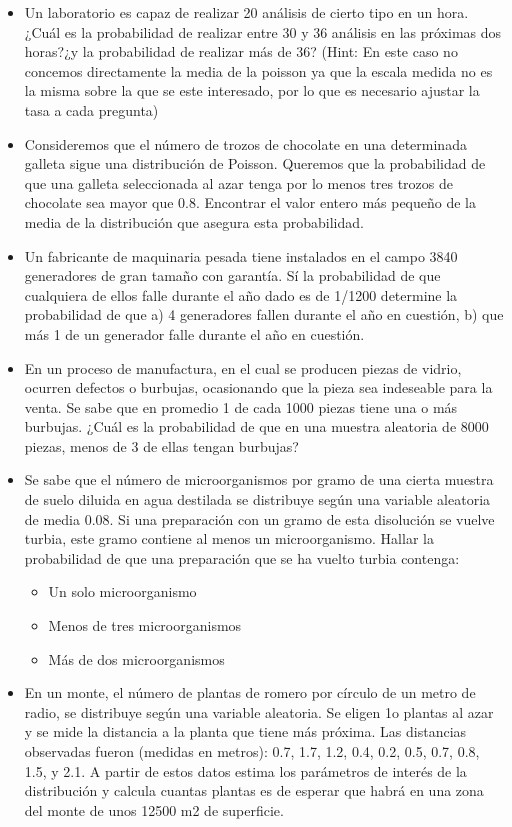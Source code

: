 \documentclass[
]{book}
\providecommand{\tightlist}{%
  \setlength{\itemsep}{0pt}\setlength{\parskip}{0pt}}
\begin{document}
\begin{itemize}
\tightlist
\item
  Un laboratorio es capaz de realizar 20 análisis de cierto tipo en un hora. ¿Cuál es la probabilidad de realizar entre 30 y 36 análisis en las próximas dos horas?¿y la probabilidad de realizar más de 36? (Hint: En este caso no concemos directamente la media de la poisson ya que la escala medida no es la misma sobre la que se este interesado, por lo que es necesario ajustar la tasa a cada pregunta)
\item
  Consideremos que el número de trozos de chocolate en una determinada galleta sigue una distribución de Poisson. Queremos que la probabilidad de que una galleta seleccionada al azar tenga por lo menos tres trozos de chocolate sea mayor que 0.8. Encontrar el valor entero más pequeño de la media de la distribución que asegura esta probabilidad.
\item
  Un fabricante de maquinaria pesada tiene instalados en el campo 3840 generadores de gran tamaño con garantía. Sí la probabilidad de que cualquiera de ellos falle durante el año dado es de 1/1200 determine la probabilidad de que a) 4 generadores fallen durante el año en cuestión, b) que más 1 de un generador falle durante el año en cuestión.
\item
  En un proceso de manufactura, en el cual se producen piezas de vidrio, ocurren defectos o burbujas, ocasionando que la pieza sea indeseable para la venta. Se sabe que en promedio 1 de cada 1000 piezas tiene una o más burbujas. ¿Cuál es la probabilidad de que en una muestra aleatoria de 8000 piezas, menos de 3 de ellas tengan burbujas?
\item
  Se sabe que el número de microorganismos por gramo de una cierta muestra de suelo diluida en agua destilada se distribuye según una variable aleatoria de media 0.08. Si una preparación con un gramo de esta disolución se vuelve turbia, este gramo contiene al menos un microorganismo. Hallar la probabilidad de que una preparación que se ha vuelto turbia contenga:

  \begin{itemize}
  \tightlist
  \item
    Un solo microorganismo
  \item
    Menos de tres microorganismos
  \item
    Más de dos microorganismos
  \end{itemize}
\item
  En un monte, el número de plantas de romero por círculo de un metro de radio, se distribuye según una variable aleatoria. Se eligen 1o plantas al azar y se mide la distancia a la planta que tiene más próxima. Las distancias observadas fueron (medidas en metros): 0.7, 1.7, 1.2, 0.4, 0.2, 0.5, 0.7, 0.8, 1.5, y 2.1. A partir de estos datos estima los parámetros de interés de la distribución y calcula cuantas plantas es de esperar que habrá en una zona del monte de unos 12500 m2 de superficie.
\end{itemize}
\end{document}
